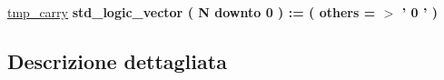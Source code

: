 \begin{DoxyCompactItemize}
\item 
\hypertarget{group___majority_voter_ga2943a61ba696a3860c97e0fc3e492416}{\hyperlink{group___majority_voter_ga2943a61ba696a3860c97e0fc3e492416}{tmp\+\_\+carry} {\bfseries \textcolor{vhdlchar}{std\+\_\+logic\+\_\+vector}\textcolor{vhdlchar}{ }\textcolor{vhdlchar}{(}\textcolor{vhdlchar}{ }\textcolor{vhdlchar}{ }\textcolor{vhdlchar}{ }\textcolor{vhdlchar}{ }\textcolor{vhdlchar}{N}\textcolor{vhdlchar}{ }\textcolor{vhdlchar}{downto}\textcolor{vhdlchar}{ }\textcolor{vhdlchar}{ } \textcolor{vhdldigit}{0} \textcolor{vhdlchar}{ }\textcolor{vhdlchar}{)}\textcolor{vhdlchar}{ }\textcolor{vhdlchar}{ }\textcolor{vhdlchar}{ }\textcolor{vhdlchar}{\+:}\textcolor{vhdlchar}{=}\textcolor{vhdlchar}{ }\textcolor{vhdlchar}{(}\textcolor{vhdlchar}{ }\textcolor{vhdlchar}{ }\textcolor{vhdlchar}{others}\textcolor{vhdlchar}{ }\textcolor{vhdlchar}{ }\textcolor{vhdlchar}{=}\textcolor{vhdlchar}{ }\textcolor{vhdlchar}{$>$}\textcolor{vhdlchar}{ }\textcolor{vhdlchar}{'}\textcolor{vhdlchar}{ } \textcolor{vhdldigit}{0} \textcolor{vhdlchar}{ }\textcolor{vhdlchar}{'}\textcolor{vhdlchar}{ }\textcolor{vhdlchar}{)}\textcolor{vhdlchar}{ }} }\label{group___majority_voter_ga2943a61ba696a3860c97e0fc3e492416}

\end{DoxyCompactItemize}


\subsection{Descrizione dettagliata}
